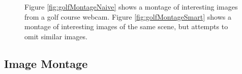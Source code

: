 \begin{figure}
	\centering
		\caption[Image montage techniques.]{Figure \ref{fig:golfMontageNaive} shows a montage of interesting images from a golf course webcam. Figure \ref{fig:golfMontageSmart} shows a montage of interesting images of the same scene, but attempts to omit similar images.}
\end{figure}

\subsection{Image Montage}

